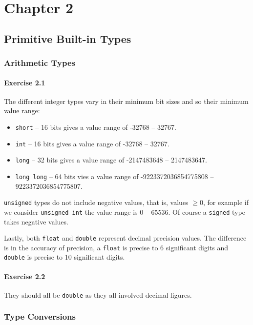 \section{Chapter 2}

\subsection{Primitive Built-in Types}

\subsubsection{Arithmetic Types}

\paragraph{Exercise 2.1} The different integer types vary in their minimum bit sizes and so their minimum value range:
\begin{itemize}
	\item 
		\texttt{short} -- 16 bits gives a value range of -32768 -- 32767.
	\item 
		\texttt{int} -- 16 bits gives a value range of -32768 -- 32767.
	\item 
		\texttt{long} -- 32 bits gives a value range of -2147483648 -- 2147483647.
	\item 
		\texttt{long long} -- 64 bits vies a value range of -9223372036854775808 -- 9223372036854775807.
\end{itemize}

\texttt{unsigned} types do not include negative values, that is, values $\geq 0$, for example if we consider \texttt{unsigned int} the value range is 0 -- 65536. Of course a \texttt{signed} type takes negative values.

Lastly, both \texttt{float} and \texttt{double} represent decimal precision values. The difference is in the accuracy of precision, a \texttt{float} is precise to 6 significant digits and \texttt{double} is precise to 10 significant digits.

\paragraph{Exercise 2.2}
They should all be \texttt{double} as they all involved decimal figures.

\subsubsection{Type Conversions}


